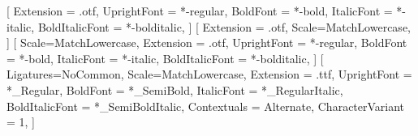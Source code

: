 \usepackage[english]{babel}

\usepackage{amsmath,amssymb,amsfonts}
\usepackage[utf8]{inputenc}

\usepackage{fontspec}
\usepackage{unicode-math}
\setmainfont{texgyretermes}[
	Extension = .otf,
	UprightFont = *-regular,
	BoldFont = *-bold,
	ItalicFont = *-italic,
	BoldItalicFont = *-bolditalic,
]
[
	Extension = .otf,
	Scale=MatchLowercase,
]
\setsansfont{texgyreheros}[
	Scale=MatchLowercase,
	Extension = .otf,
	UprightFont = *-regular,    
	BoldFont = *-bold,
	ItalicFont = *-italic,
	BoldItalicFont = *-bolditalic,
]
\setmonofont{JuliaMono}[
	Ligatures=NoCommon,
	Scale=MatchLowercase,
	Extension = .ttf,
	UprightFont = *_Regular,
	BoldFont = *_SemiBold,
	ItalicFont = *_RegularItalic,
	BoldItalicFont = *_SemiBoldItalic,
	Contextuals = Alternate,
	CharacterVariant = 1,
]

\usepackage{lastpage}

\usepackage{gensymb}

\usepackage{setspace}

\usepackage{ccicons}

\usepackage[hang,flushmargin]{footmisc}

\usepackage{geometry}

\setlength{\parindent}{0pt}
\setlength{\parskip}{6pt plus 2pt minus 1pt}

\usepackage{fancyhdr}
\renewcommand{\headrulewidth}{0pt}